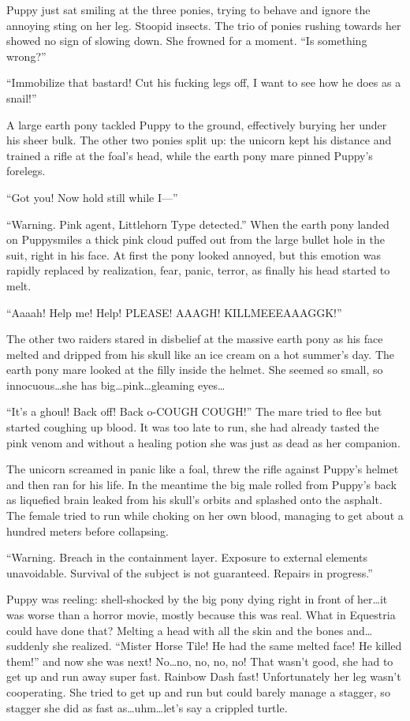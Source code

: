 Puppy just sat smiling at the three ponies, trying to behave and ignore the annoying sting on her leg. Stoopid insects. The trio of ponies rushing towards her showed no sign of slowing down. She frowned for a moment. ``Is something wrong?''

``Immobilize that bastard! Cut his fucking legs off, I want to see how he does as a snail!''

A large earth pony tackled Puppy to the ground, effectively burying her under his sheer bulk. The other two ponies split up: the unicorn kept his distance and trained a rifle at the foal's head, while the earth pony mare pinned Puppy's forelegs.

``Got you! Now hold still while I---''

``{\mt Warning. Pink agent, Littlehorn Type detected.}'' When the earth pony landed on Puppysmiles a thick pink cloud puffed out from the large bullet hole in the suit, right in his face. At first the pony looked annoyed, but this emotion was rapidly replaced by realization, fear, panic, terror, as finally his head started to melt.

``Aaaah! Help me! Help! PLEASE! AAAGH! KILLMEEEAAAGGK!''

The other two raiders stared in disbelief at the massive earth pony as his face melted and dripped from his skull like an ice cream on a hot summer's day. The earth pony mare looked at the filly inside the helmet. She seemed so small, so innocuous\dots she has big\dots pink\dots gleaming eyes\dots

``It's a ghoul! Back off! Back o-COUGH COUGH!'' The mare tried to flee but started coughing up blood. It was too late to run, she had already tasted the pink venom and without a healing potion she was just as dead as her companion.

The unicorn screamed in panic like a foal, threw the rifle against Puppy's helmet and then ran for his life. In the meantime the big male rolled from Puppy's back as liquefied brain leaked from his skull's orbits and splashed onto the asphalt. The female tried to run while choking on her own blood, managing to get about a hundred meters before collapsing.

``{\mt Warning. Breach in the containment layer. Exposure to external elements unavoidable. Survival of the subject is not guaranteed. Repairs in progress.}''

Puppy was reeling: shell-shocked by the big pony dying right in front of her\dots it was worse than a horror movie, mostly because this was real. What in Equestria could have done that? Melting a head with all the skin and the bones and\dots suddenly she realized. ``Mister Horse Tile! He had the same melted face! He killed them!'' and now she was next! No\dots no, no, no, no! That wasn't good, she had to get up and run away super fast. Rainbow Dash fast! Unfortunately her leg wasn't cooperating. She tried to get up and run but could barely manage a stagger, so stagger she did as fast as\dots uhm\dots let's say a crippled turtle.

